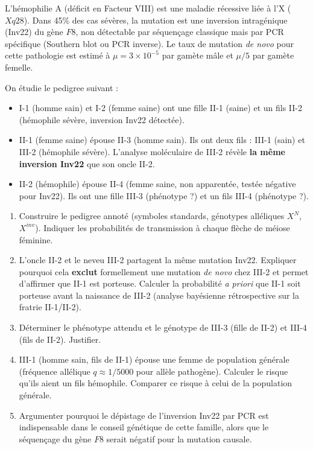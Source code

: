 \documentclass[11pt]{article}
\begin{document}
\begin{exercice}
L'hémophilie A (déficit en Facteur VIII) est une maladie récessive liée à l'X ($Xq28$). Dans 45\% des cas sévères, la mutation est une inversion intragénique (Inv22) du gène $F8$, non détectable par séquençage classique mais par PCR spécifique (Southern blot ou PCR inverse). Le taux de mutation \textit{de novo} pour cette pathologie est estimé à $\mu = 3 \times 10^{-5}$ par gamète mâle et $\mu/5$ par gamète femelle.

On étudie le pedigree suivant :
\begin{itemize}
    \item I-1 (homme sain) et I-2 (femme saine) ont une fille II-1 (saine) et un fils II-2 (hémophile sévère, inversion Inv22 détectée).
    \item II-1 (femme saine) épouse II-3 (homme sain). Ils ont deux fils : III-1 (sain) et III-2 (hémophile sévère). L'analyse moléculaire de III-2 révèle \textbf{la même inversion Inv22} que son oncle II-2.
    \item II-2 (hémophile) épouse II-4 (femme saine, non apparentée, testée négative pour Inv22). Ils ont une fille III-3 (phénotype ?) et un fils III-4 (phénotype ?).
\end{itemize}

\begin{enumerate}
    \item Construire le pedigree annoté (symboles standards, génotypes alléliques $X^N$, $X^{inv}$). Indiquer les probabilités de transmission à chaque flèche de méiose féminine.
    \item L'oncle II-2 et le neveu III-2 partagent la même mutation Inv22. Expliquer pourquoi cela \textbf{exclut} formellement une mutation \textit{de novo} chez III-2 et permet d'affirmer que II-1 est porteuse. Calculer la probabilité \textit{a priori} que II-1 soit porteuse avant la naissance de III-2 (analyse bayésienne rétrospective sur la fratrie II-1/II-2).
    \item Déterminer le phénotype attendu et le génotype de III-3 (fille de II-2) et III-4 (fils de II-2). Justifier.
    \item III-1 (homme sain, fils de II-1) épouse une femme de population générale (fréquence allélique $q \approx 1/5000$ pour allèle pathogène). Calculer le risque qu'ils aient un fils hémophile. Comparer ce risque à celui de la population générale.
    \item Argumenter pourquoi le dépistage de l'inversion Inv22 par PCR est indispensable dans le conseil génétique de cette famille, alors que le séquençage du gène $F8$ serait négatif pour la mutation causale.
\end{enumerate}
\end{exercice}
\end{document}
